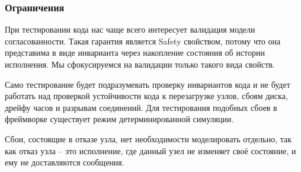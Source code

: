 \subsubsection{Ограничения}

При тестировании кода нас чаще всего интересует валидация модели согласованности. Такая гарантия является Safety свойством, потому что она представима в виде инварианта через накопление состояния об истории исполнения. Мы сфокусируемся на валидации только такого вида свойств.

Само тестирование будет подразумевать проверку инвариантов кода и не будет работать над проверкой устойчивости кода к перезагрузке узлов, сбоям диска, дрейфу часов и разрывам соединений. Для тестирования подобных сбоев в фреймворке существует режим детерминированной симуляции.

Сбои, состоящие в отказе узла, нет необходимости моделировать отдельно, так как отказ узла – это исполнение, где данный узел не изменяет своё состояние, и ему не доставляются сообщения.
